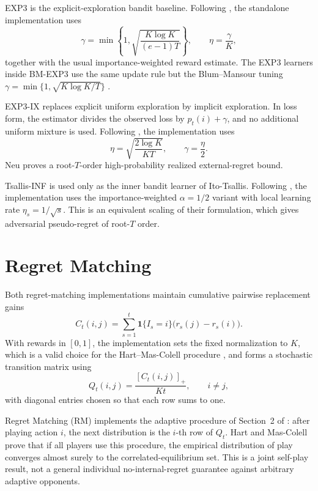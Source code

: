 EXP3 is the explicit-exploration bandit baseline. Following
\citet{auer_nonstochastic_2002}, the standalone implementation uses
\[
    \gamma=\min\left\{1,\sqrt{\frac{K\log K}{(e-1)T}}\right\},
    \qquad
    \eta=\frac{\gamma}{K},
\]
together with the usual importance-weighted reward estimate. The EXP3 learners
inside BM-EXP3 use the same update rule but the Blum--Mansour tuning
\(\gamma=\min\{1,\sqrt{K\log K/T}\}\) \citep{blum_external_2007}.

EXP3-IX replaces explicit uniform exploration by implicit exploration. In loss form, the estimator divides the observed
loss by \(p_t(i)+\gamma\), and no additional uniform mixture is used. Following
\citet{neu_explore_2015}, the implementation uses
\[
    \eta=\sqrt{\frac{2\log K}{KT}},
    \qquad
    \gamma=\frac{\eta}{2}.
\]
Neu proves a root-$T$-order high-probability realized external-regret bound.

Tsallis-INF is used only as the inner bandit learner of Ito-Tsallis. Following
\citet{zimmert_tsallis-inf_2021}, the implementation uses the
importance-weighted \(\alpha=1/2\) variant with local learning rate
\(\eta_s=1/\sqrt{s}\). This is an equivalent scaling of their formulation, which gives adversarial pseudo-regret of
root-$T$ order.

\section{Regret Matching}

Both regret-matching implementations maintain cumulative pairwise replacement
gains
\[
    C_t(i,j)
    =
    \sum_{s=1}^{t}
    \mathbf 1\{I_s=i\}
    \bigl(r_s(j)-r_s(i)\bigr).
\]
With rewards in \([0,1]\), the implementation sets the fixed normalization to \(K\),
which is a valid choice for the Hart--Mas-Colell procedure \citep{hart_simple_2000},
and forms a stochastic transition matrix using
\[
    Q_t(i,j)=\frac{[C_t(i,j)]_+}{Kt},
    \qquad i\neq j,
\]
with diagonal entries chosen so that each row sums to one.

Regret Matching (RM) implements the adaptive procedure of Section~2 of
\citet{hart_simple_2000}: after playing action \(i\), the next distribution is
the \(i\)-th row of \(Q_t\). Hart and Mas-Colell prove that if all players use
this procedure, the empirical distribution of play converges almost surely to
the correlated-equilibrium set. This is a joint self-play result, not a
general individual no-internal-regret guarantee against arbitrary adaptive
opponents.

